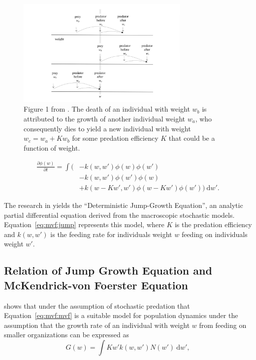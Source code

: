 \documentclass[../main.tex]{subfiles}
\begin{document}
  \begin{figure}
    \centering
    \includegraphics[width=0.75\textwidth]{img/stochastic_predation.png}
    \caption{Figure 1 from \cite{datta2010}. The death of an individual with weight $w_b$ is attributed to the growth of another individual weight $w_a$, who consequently dies to yield a new individual with weight $w_c = w_a + K w_b$ for some predation efficiency $K$ that could be a function of weight. \label{fig:mvf:predation}}
  \end{figure}

  \begin{align}\label{eq:mvf:jump}
    \frac{\partial \phi(w)}{\partial t}
    = \int ( &- k(w, w') \phi(w)\phi(w') \nonumber \\
    & - k(w, w')\phi(w')\phi(w) \nonumber \\
    & + k(w - Kw', w')\phi(w - Kw')\phi(w')) \: \mathrm{d}w'.
  \end{align}

  The research in \cite{datta2010} yields the ``Deterministic Jump-Growth Equation'', an analytic partial differential equation derived from the macroscopic stochastic models. Equation~\ref{eq:mvf:jump} represents this model, where $K$ is the predation efficiency and $k(w, w')$ is the feeding rate for individuals weight $w$ feeding on individuals weight $w'$.

  \subsection{Relation of Jump Growth Equation and McKendrick-von Foerster Equation}
  \cite{law2009} shows that under the assumption of stochastic predation that Equation~\ref{eq:mvf:mvf} is a suitable model for population dynamics under the assumption that the growth rate of an individual with weight $w$ from feeding on smaller organizations can be expressed as
  \begin{equation}
    G(w) = \int K w' k(w, w') N(w') \: \mathrm{d}w',
  \end{equation}
\end{document}
